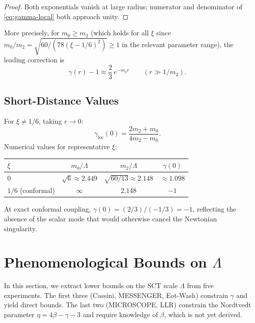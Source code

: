 \documentclass[11pt,a4paper]{article}
\begin{document}
\begin{proof}
Both exponentials vanish at large radius; numerator and denominator of
\cref{eq:gamma-local} both approach unity.
\end{proof}

More precisely, for $m_0 \geq m_2$ (which holds for all $\xi$ since
$m_0/m_2 = \sqrt{60/(78(\xi-1/6)^2)} \geq 1$ in the relevant parameter
range), the leading correction is
\begin{equation}\label{eq:gamma-asymp}
  \gamma(r) - 1 \approx \frac{2}{3}\,e^{-m_2 r}
  \qquad (r \gg 1/m_2).
\end{equation}

\subsection{Short-Distance Values}
\label{sec:gamma-short}

For $\xi \neq 1/6$, taking $r \to 0$:
\begin{equation}\label{eq:gamma-zero}
  \gamma_{\mathrm{loc}}(0)
  = \frac{2m_2 + m_0}{4m_2 - m_0}.
\end{equation}
Numerical values for representative $\xi$:
\begin{center}
\begin{tabular}{lccc}
\toprule
$\xi$ & $m_0/\Lambda$ & $m_2/\Lambda$ & $\gamma(0)$ \\
\midrule
$0$ & $\sqrt{6} \approx 2.449$ & $\sqrt{60/13} \approx 2.148$ & $\approx 1.098$ \\
$1/6$ (conformal) & $\infty$ & $2.148$ & $-1$ \\
\bottomrule
\end{tabular}
\end{center}
At exact conformal coupling, $\gamma(0) = (2/3)/(-1/3) = -1$,
reflecting the absence of the scalar mode that would otherwise
cancel the Newtonian singularity.


\section{Phenomenological Bounds on \texorpdfstring{$\Lambda$}{Lambda}}
\label{sec:bounds}

In this section, we extract lower bounds on the SCT scale $\Lambda$ from
five experiments.  The first three (Cassini, MESSENGER, Eot-Wash) constrain
$\gamma$ and yield direct bounds.  The last two (MICROSCOPE, LLR) constrain
the Nordtvedt parameter $\eta = 4\beta - \gamma - 3$ and require knowledge
of $\beta$, which is not yet derived.
\end{document}
